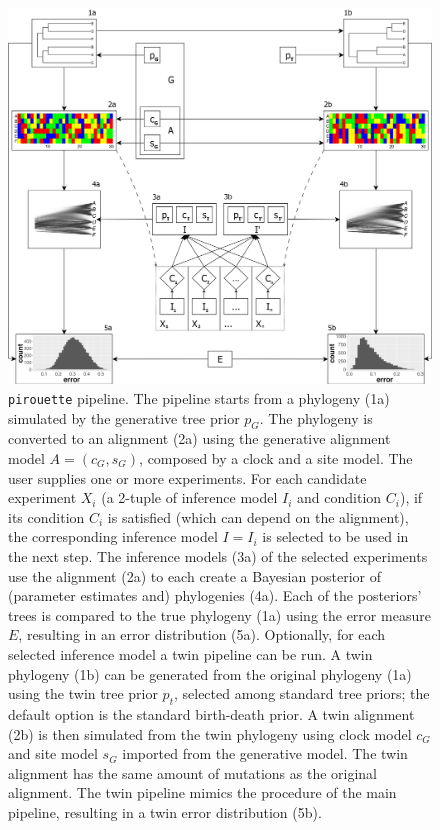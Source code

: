\begin{figure}
  \centering
  \includegraphics[width = \textwidth]{workflow4.png}
  \caption{
    \texttt{pirouette} pipeline.
    The pipeline starts from a phylogeny (1a) simulated by the generative tree prior 
    $\mathit{p_{G}}$.
    The phylogeny is converted to an alignment (2a) using the generative alignment model 
    $\mathit{A} = (\mathit{c_{G}}, \mathit{s_{G}})$, composed by a clock and a site model. 
    The user supplies one or more experiments.
    For each candidate experiment $\mathit{X_{i}}$ 
    (a 2-tuple of inference model $\mathit{I_{i}}$ and condition $\mathit{C_{i}}$),
    if its condition $\mathit{C_{i}}$ is 
    satisfied (which can depend on the alignment), 
    the corresponding inference model $\mathit{I} = \mathit{I_{i}}$ is selected 
    to be used in the next step.
    The inference models (3a) of the selected experiments use the alignment (2a) 
    to each create a Bayesian posterior of (parameter estimates and) 
    phylogenies (4a). 
    Each of the posteriors' trees is compared to the true phylogeny (1a) 
    using the error measure $\mathit{E}$, 
    resulting in an error distribution (5a). 
    Optionally, for each selected inference model a twin pipeline can be run.
    A twin phylogeny (1b) can be generated from the original 
    phylogeny (1a) using the twin tree prior $\mathit{p_{t}}$, selected among standard tree priors; the default option is the standard birth-death prior.
    A twin alignment (2b) is then simulated from the twin phylogeny using clock model $\mathit{c_{G}}$ and site model $\mathit{s_{G}}$ imported from the generative model. The twin alignment has the same amount of mutations as the original alignment.
    The twin pipeline mimics the procedure of the main pipeline, resulting in a twin error distribution (5b).
  }
  \label{fig:pipeline}
\end{figure}

